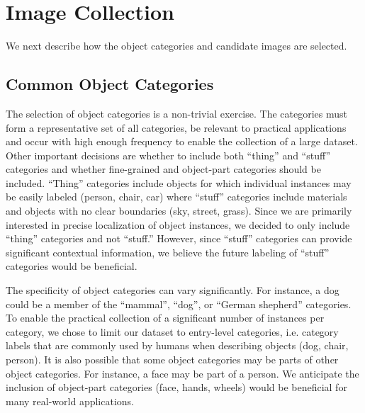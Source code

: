 \section{Image Collection}\label{sec:image_collection}

We next describe how the object categories and candidate images are selected.

\subsection{Common Object Categories} The selection of object categories is a non-trivial exercise. The categories must form a representative set of all categories, be relevant to practical applications and occur with high enough frequency to enable the collection of a large dataset. Other important decisions are whether to include both ``thing'' and ``stuff'' categories \cite{heitz2008learning} and whether fine-grained \cite{Birds200,Imagenet} and object-part categories should be included. ``Thing'' categories include objects for which individual instances may be easily labeled (person, chair, car) where ``stuff'' categories include materials and objects with no clear boundaries (sky, street, grass). Since we are primarily interested in precise localization of object instances, we decided to only include ``thing'' categories and not ``stuff.'' However, since ``stuff'' categories can provide significant contextual information, we believe the future labeling of ``stuff'' categories would be beneficial.

The specificity of object categories can vary significantly. For instance, a dog could be a member of the ``mammal'', ``dog'', or ``German shepherd'' categories. To enable the practical collection of a significant number of instances per category, we chose to limit our dataset to entry-level categories, i.e. category labels that are commonly used by humans when describing objects (dog, chair, person). It is also possible that some object categories may be parts of other object categories. For instance, a face may be part of a person. We anticipate the inclusion of object-part categories (face, hands, wheels) would be beneficial for many real-world applications.

